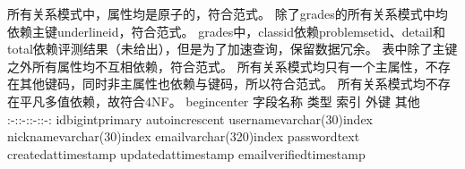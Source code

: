 {}所有关系模式中，属性均是原子的，符合范式。\markdownRendererInterblockSeparator
{}\markdownRendererInterblockSeparator
{}除了grades的所有关系模式中均依赖主键\markdownRendererBackslash{}underline\markdownRendererLeftBrace{}id\markdownRendererRightBrace{}，符合范式。\markdownRendererInterblockSeparator
{}grades中，class\markdownRendererBackslash{}\markdownRendererUnderscore{}id依赖problem\markdownRendererBackslash{}\markdownRendererUnderscore{}set\markdownRendererBackslash{}\markdownRendererUnderscore{}id、detail和total依赖评测结果（未给出），但是为了加速查询，保留数据冗余。\markdownRendererInterblockSeparator
{}\markdownRendererInterblockSeparator
{}表中除了主键之外所有属性均不互相依赖，符合范式。\markdownRendererInterblockSeparator
{}\markdownRendererInterblockSeparator
{}所有关系模式均只有一个主属性，不存在其他键码，同时非主属性也依赖与键码，所以符合范式。\markdownRendererInterblockSeparator
{}\markdownRendererInterblockSeparator
{}所有关系模式均不存在平凡多值依赖，故符合4NF。\markdownRendererInterblockSeparator
{}\markdownRendererInterblockSeparator
{}\markdownRendererInterblockSeparator
{}\markdownRendererBackslash{}begin\markdownRendererLeftBrace{}center\markdownRendererRightBrace{}\markdownRendererInterblockSeparator
{}\markdownRendererPipe{} 字段名称 \markdownRendererPipe{} 类型 \markdownRendererPipe{} 索引 \markdownRendererPipe{} 外键 \markdownRendererPipe{} 其他 \markdownRendererPipe{} \markdownRendererPipe{}:-:\markdownRendererPipe{}:-:\markdownRendererPipe{}:-:\markdownRendererPipe{}:-:\markdownRendererPipe{} \markdownRendererPipe{}id\markdownRendererPipe{}bigint\markdownRendererPipe{}primary\markdownRendererPipe{}\markdownRendererPipe{} auto\markdownRendererBackslash{}\markdownRendererUnderscore{}increscent\markdownRendererPipe{} \markdownRendererPipe{}username\markdownRendererPipe{}varchar(30)\markdownRendererPipe{}index\markdownRendererPipe{}\markdownRendererPipe{}\markdownRendererPipe{} \markdownRendererPipe{}nickname\markdownRendererPipe{}varchar(30)\markdownRendererPipe{}index\markdownRendererPipe{}\markdownRendererPipe{}\markdownRendererPipe{} \markdownRendererPipe{}email\markdownRendererPipe{}varchar(320)\markdownRendererPipe{}index\markdownRendererPipe{}\markdownRendererPipe{}\markdownRendererPipe{} \markdownRendererPipe{}password\markdownRendererPipe{}text\markdownRendererPipe{}\markdownRendererPipe{}\markdownRendererPipe{}\markdownRendererPipe{} \markdownRendererPipe{}created\markdownRendererBackslash{}\markdownRendererUnderscore{}at\markdownRendererPipe{}timestamp\markdownRendererPipe{}\markdownRendererPipe{}\markdownRendererPipe{}\markdownRendererPipe{} \markdownRendererPipe{}updated\markdownRendererBackslash{}\markdownRendererUnderscore{}at\markdownRendererPipe{}timestamp\markdownRendererPipe{}\markdownRendererPipe{}\markdownRendererPipe{}\markdownRendererPipe{} \markdownRendererPipe{}email\markdownRendererBackslash{}\markdownRendererUnderscore{}verified\markdownRendererPipe{}timestamp\markdownRendererPipe{}\markdownRendererPipe{}\markdownRendererPipe{}\markdownRendererPipe{}\markdownRendererInterblockSeparator
